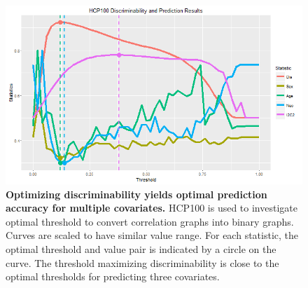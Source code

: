 \documentclass{article}
\begin{document}
\begin{figure}[ht!]
\includegraphics[width=\linewidth]{../Figs/HCP_100.png}
\caption{{\bf Optimizing discriminability yields optimal prediction accuracy for multiple covariates.} HCP100 is used to investigate optimal threshold to convert correlation graphs into binary graphs. Curves are scaled to have similar value range. For each statistic, the optimal threshold and value pair is indicated by a circle on the curve. The threshold maximizing discriminability is close to the optimal thresholds for predicting three covariates. }
\label{fig:hcp}
\end{figure}
\end{document}
